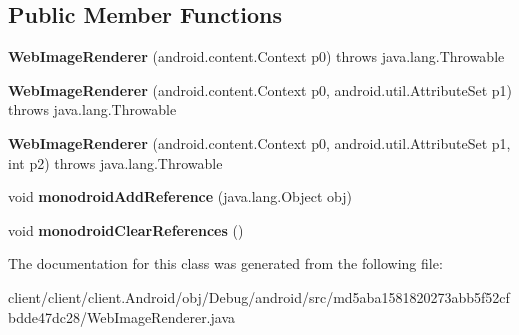 \subsection*{Public Member Functions}
\begin{DoxyCompactItemize}
\item 
\hypertarget{classmd5aba1581820273abb5f52cfbdde47dc28_1_1WebImageRenderer_ac308c8b217d0ab8ba47ee0de580c1997}{}{\bfseries Web\+Image\+Renderer} (android.\+content.\+Context p0)  throws java.\+lang.\+Throwable 	\label{classmd5aba1581820273abb5f52cfbdde47dc28_1_1WebImageRenderer_ac308c8b217d0ab8ba47ee0de580c1997}

\item 
\hypertarget{classmd5aba1581820273abb5f52cfbdde47dc28_1_1WebImageRenderer_a52700514d9f99319e0c772d14f85a0d9}{}{\bfseries Web\+Image\+Renderer} (android.\+content.\+Context p0, android.\+util.\+Attribute\+Set p1)  throws java.\+lang.\+Throwable 	\label{classmd5aba1581820273abb5f52cfbdde47dc28_1_1WebImageRenderer_a52700514d9f99319e0c772d14f85a0d9}

\item 
\hypertarget{classmd5aba1581820273abb5f52cfbdde47dc28_1_1WebImageRenderer_a4275152b7fc834b1293432e50f2b12f7}{}{\bfseries Web\+Image\+Renderer} (android.\+content.\+Context p0, android.\+util.\+Attribute\+Set p1, int p2)  throws java.\+lang.\+Throwable 	\label{classmd5aba1581820273abb5f52cfbdde47dc28_1_1WebImageRenderer_a4275152b7fc834b1293432e50f2b12f7}

\item 
\hypertarget{classmd5aba1581820273abb5f52cfbdde47dc28_1_1WebImageRenderer_a9ec2846db346fc279c8f2c834a5d4400}{}void {\bfseries monodroid\+Add\+Reference} (java.\+lang.\+Object obj)\label{classmd5aba1581820273abb5f52cfbdde47dc28_1_1WebImageRenderer_a9ec2846db346fc279c8f2c834a5d4400}

\item 
\hypertarget{classmd5aba1581820273abb5f52cfbdde47dc28_1_1WebImageRenderer_a40556820ca777136eb3984c9b9460cf5}{}void {\bfseries monodroid\+Clear\+References} ()\label{classmd5aba1581820273abb5f52cfbdde47dc28_1_1WebImageRenderer_a40556820ca777136eb3984c9b9460cf5}

\end{DoxyCompactItemize}


The documentation for this class was generated from the following file\+:\begin{DoxyCompactItemize}
\item 
client/client/client.\+Android/obj/\+Debug/android/src/md5aba1581820273abb5f52cfbdde47dc28/Web\+Image\+Renderer.\+java\end{DoxyCompactItemize}
